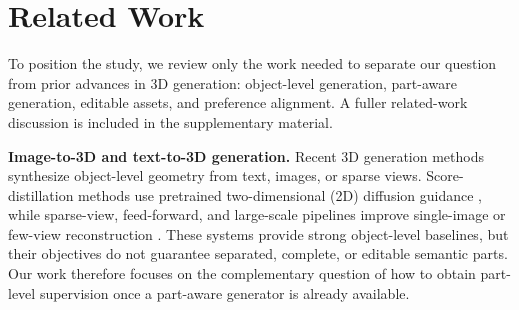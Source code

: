 \documentclass[10pt,twocolumn,letterpaper]{article}
\newcommand{\mainfigwidth}{0.99\textwidth}
\newcommand{\widefigheight}{0.40\textheight}
\begin{document}

\section{Related Work}
To position the study, we review only the work needed to separate our question from prior advances in 3D generation: object-level generation, part-aware generation, editable assets, and preference alignment. A fuller related-work discussion is included in the supplementary material.

\noindent\textbf{Image-to-3D and text-to-3D generation.}
Recent 3D generation methods synthesize object-level geometry from text, images, or sparse views. Score-distillation methods use pretrained two-dimensional (2D) diffusion guidance \cite{poole2022dreamfusion,lin2023magic3d}, while sparse-view, feed-forward, and large-scale pipelines improve single-image or few-view reconstruction \cite{liu2023zero1to3,hong2023lrm,li2025triposg}. These systems provide strong object-level baselines, but their objectives do not guarantee separated, complete, or editable semantic parts.
Our work therefore focuses on the complementary question of how to obtain part-level supervision once a part-aware generator is already available.
\end{document}
